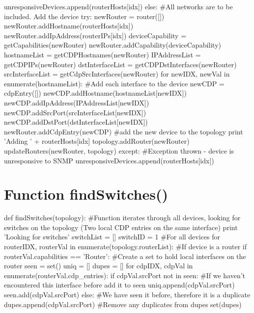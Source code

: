 \documentclass[11pt]{report}
\begin{document}
\begin{appendices}
\begin{python}
								unresponsiveDevices.append(routerHosts[idx])
			else:
				#All networks are to be included. Add the device
				try:
					newRouter = router([])
					newRouter.addHostname(routerHosts[idx])
					newRouter.addIpAddress(routerIPs[idx])
					deviceCapability = getCapabilities(newRouter)
					newRouter.addCapability(deviceCapability)
					hostnameList = getCDPHostnames(newRouter)
					IPAddressList = getCDPIPs(newRouter)
					dstInterfaceList = getCDPDstInterfaces(newRouter)
					srcInterfaceList = getCdpSrcInterfaces(newRouter)
					for newIDX, newVal in enumerate(hostnameList):
						#Add each interface to the device
						newCDP = cdpEntry([])
						newCDP.addHostname(hostnameList[newIDX])
						newCDP.addIpAddress(IPAddressList[newIDX])
						newCDP.addSrcPort(srcInterfaceList[newIDX])
						newCDP.addDstPort(dstInterfaceList[newIDX])
						newRouter.addCdpEntry(newCDP)
					#add the new device to the topology
					print 'Adding ' + routerHosts[idx]
					topology.addRouter(newRouter)
					updateRouters(newRouter, topology)
				except:
					#Exception thrown - device is unresponsive to SNMP
					unresponsiveDevices.append(routerHosts[idx])
\end{python}

\chapter{Function findSwitches()}

\begin{python}
def findSwitches(topology):
	#Function iterates through all devices, looking for switches on the topology (Two local CDP entries on the same interface)
	print 'Looking for switches'
	switchList = []
	switchID = 1
	#For all devices
	for routerIDX, routerVal in enumerate(topology.routerList):
		#If device is a router
		if routerVal.capabilities == 'Router':
			#Create a set to hold local interfaces on the router
			seen = set()
			uniq = []
			dupes = []
			for cdpIDX, cdpVal in enumerate(routerVal.cdp_entries):
				if cdpVal.srcPort not in seen:
					#If we haven't encountered this interface before add it to seen
					uniq.append(cdpVal.srcPort)
					seen.add(cdpVal.srcPort)
				else:
					#We have seen it before, therefore it is a duplicate
					dupes.append(cdpVal.srcPort)
			#Remove any duplicates from dupes
			set(dupes)
			

\end{python}
\end{appendices}
\end{document}
